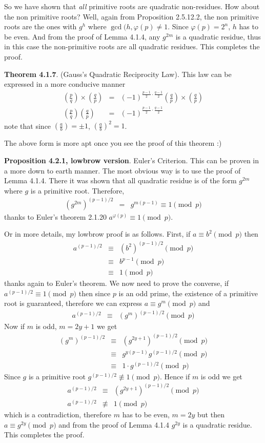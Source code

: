\documentclass[aps,preprint,preprintnumbers,nofootinbib,showpacs,prd]{revtex4-1}
\newcommand{\nbea}{\begin{eqnarray*}}
\newcommand{\neea}{\end{eqnarray*}}
\begin{document}
So we have shown that {\it all} primitive roots are quadratic non-residues. How about the non primitive roots? Well, again from Proposition 2.5.12.2, the non primitive roots are the ones with $g^h$ where $\gcd(h, \varphi(p) \neq 1$. Since $\varphi(p) = 2^n$, $h$ has to be even. And from the proof of Lemma 4.1.4, any $g^{2m}$ is a quadratic residue, thus in this case the non-primitive roots are all quadratic residues. This completes the proof.

{\bf Theorem 4.1.7}.  (Gauss’s Quadratic Reciprocity Law). This law can be expressed in a more conducive manner
%
\nbea
\left ( \frac{p}{q} \right ) \times \left ( \frac{q}{p} \right ) & = & (-1)^{\frac{p-1}{2} \cdot \frac{q-1}{2}} \left ( \frac{q}{p} \right ) \times \left ( \frac{q}{p} \right ) \\
\left ( \frac{p}{q} \right ) \left ( \frac{q}{p} \right ) & = & (-1)^{\frac{p-1}{2} \cdot \frac{q-1}{2}}
\neea
%
note that since $\left ( \frac{a}{b} \right ) = \pm1$, $\left ( \frac{a}{b} \right )^2 = 1$.

The above form is more apt once you see the proof of this theorem :)

{\bf Proposition 4.2.1, lowbrow version}. Euler's Criterion. This can be proven in a more down to earth manner. The most obvious way is to use the proof of Lemma 4.1.4. There it was shown that all quadratic residue is of the form $g^{2m}$ where $g$ is a primitive root. Therefore,
%
\nbea
(g^{2m})^{(p-1)/2} & = & g^{m(p-1)} \equiv 1 \pmod{p}
\neea
%
thanks to Euler's theorem 2.1.20 $a^{\varphi(p)} \equiv 1 \pmod{p}$.

Or in more details, my lowbrow proof is as follows. First, if $a \equiv b^2 \pmod{p}$ then
%
\nbea
a^{(p-1)/2} & \equiv & (b^2)^{(p-1)/2} \pmod{p} \\
& \equiv & b^{p-1} \pmod{p} \\
& \equiv & 1 \pmod{p}
\neea
%
thanks again to Euler's theorem. We now need to prove the converse, if $a^{(p-1)/2} \equiv 1 \pmod{p}$ then since $p$ is an odd prime, the existence of a primitive root is guaranteed, therefore we can express $a \equiv g^{m} \pmod{p}$ and
%
\nbea
a^{(p-1)/2} & \equiv & (g^m)^{(p-1)/2} \pmod{p}
\neea
%
Now if $m$ is odd, $m = 2y+1$ we get
%
\nbea
(g^m)^{(p-1)/2} & \equiv & (g^{2y+1})^{(p-1)/2} \pmod{p} \\
& \equiv & g^{y(p-1)} g^{(p-1)/2} \pmod{p} \\
& \equiv & 1 \cdot g^{(p-1)/2} \pmod{p}
\neea
%
Since $g$ is a primitive root $g^{(p-1)/2} \not\equiv 1 \pmod{p}$. Hence if $m$ is odd we get
%
\nbea
a^{(p-1)/2} & \equiv & (g^{2y+1})^{(p-1)/2} \pmod{p} \\
a^{(p-1)/2} & \not\equiv & 1 \pmod{p}
\neea
%
which is a contradiction, therefore $m$ has to be even, $m=2y$ but then $a \equiv g^{2y} \pmod{p}$ and from the proof of Lemma 4.1.4 $g^{2y}$ is a quadratic residue. This completes the proof.
\end{document}
